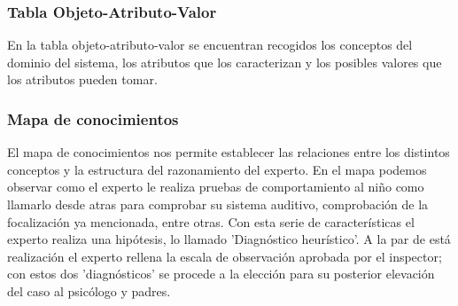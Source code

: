\documentclass[letterpaper,12pt]{article}
\begin{document}
\subsubsection{Tabla Objeto-Atributo-Valor}
En la tabla objeto-atributo-valor se encuentran recogidos los conceptos
del dominio del sistema, los atributos que los caracterizan y los posibles valores que los atributos pueden tomar.

\begin{flushleft}
\end{flushleft}
\subsubsection{Mapa de conocimientos}
El mapa de conocimientos nos permite establecer las relaciones entre los
distintos conceptos y la estructura del razonamiento del experto.
En el mapa podemos observar como el experto le realiza pruebas de comportamiento al niño como llamarlo desde atras para comprobar su sistema auditivo, comprobación de la focalización ya mencionada, entre otras. Con esta serie de características el experto realiza una hipótesis, lo llamado ’Diagnóstico heurístico’. A la par de está realización el experto rellena la escala de observación aprobada por el inspector; con estos dos ’diagnósticos’ se procede a la elección para su posterior elevación del caso al psicólogo y padres.
\end{document}
